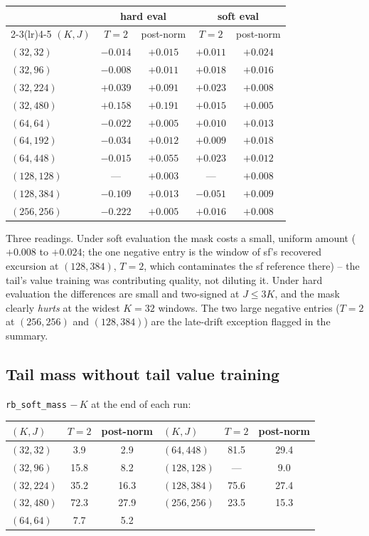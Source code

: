 \documentclass[11pt,a4paper]{article}
\newcommand{\code}[1]{\texttt{#1}}
\begin{document}
\begin{center}\small
\begin{tabular}{lcccc}
\toprule
& \multicolumn{2}{c}{hard eval} & \multicolumn{2}{c}{soft eval} \\
\cmidrule(lr){2-3}\cmidrule(lr){4-5}
$(K,J)$ & $T{=}2$ & post-norm & $T{=}2$ & post-norm \\
\midrule
$(32,32)$   & $-0.014$ & $+0.015$ & $+0.011$ & $+0.024$ \\
$(32,96)$   & $-0.008$ & $+0.011$ & $+0.018$ & $+0.016$ \\
$(32,224)$  & $+0.039$ & $+0.091$ & $+0.023$ & $+0.008$ \\
$(32,480)$  & $+0.158$ & $+0.191$ & $+0.015$ & $+0.005$ \\
$(64,64)$   & $-0.022$ & $+0.005$ & $+0.010$ & $+0.013$ \\
$(64,192)$  & $-0.034$ & $+0.012$ & $+0.009$ & $+0.018$ \\
$(64,448)$  & $-0.015$ & $+0.055$ & $+0.023$ & $+0.012$ \\
$(128,128)$ & --- & $+0.003$ & --- & $+0.008$ \\
$(128,384)$ & $-0.109$ & $+0.013$ & $-0.051$ & $+0.009$ \\
$(256,256)$ & $-0.222$ & $+0.005$ & $+0.016$ & $+0.008$ \\
\bottomrule
\end{tabular}
\end{center}

Three readings. Under soft evaluation the mask costs a small, uniform amount
($+0.008$ to $+0.024$; the one negative entry is the window of sf's recovered
excursion at $(128,384)$, $T=2$, which contaminates the sf reference there) --
the tail's value training was contributing quality, not diluting it. Under
hard evaluation the differences are small and two-signed at $J \le 3K$, and
the mask clearly \emph{hurts} at the widest $K=32$ windows. The two large
negative entries ($T=2$ at $(256,256)$ and $(128,384)$) are the late-drift
exception flagged in the summary.

\subsection*{Tail mass without tail value training}

\code{rb\_soft\_mass} $-\,K$ at the end of each run:

\begin{center}\small
\begin{tabular}{lcc|lcc}
\toprule
$(K,J)$ & $T{=}2$ & post-norm & $(K,J)$ & $T{=}2$ & post-norm \\
\midrule
$(32,32)$  & 3.9  & 2.9  & $(64,448)$  & 81.5 & 29.4 \\
$(32,96)$  & 15.8 & 8.2  & $(128,128)$ & ---  & 9.0  \\
$(32,224)$ & 35.2 & 16.3 & $(128,384)$ & 75.6 & 27.4 \\
$(32,480)$ & 72.3 & 27.9 & $(256,256)$ & 23.5 & 15.3 \\
$(64,64)$  & 7.7  & 5.2  & & & \\
\bottomrule
\end{tabular}
\end{center}
\end{document}
